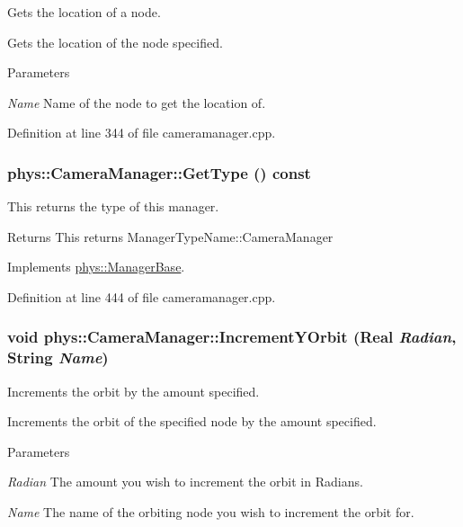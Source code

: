 Gets the location of a node. 

Gets the location of the node specified. 
\begin{DoxyParams}{Parameters}
\item[{\em Name}]Name of the node to get the location of. \end{DoxyParams}


Definition at line 344 of file cameramanager.cpp.

\hypertarget{classphys_1_1CameraManager_a8412ea634307aa280b615a3cc7c9b739}{
\subsubsection[{GetType}]{ phys::CameraManager::GetType () const}}
\label{d9/d91/classphys_1_1CameraManager_a8412ea634307aa280b615a3cc7c9b739}


This returns the type of this manager. 

\begin{DoxyReturn}{Returns}
This returns ManagerTypeName::CameraManager 
\end{DoxyReturn}


Implements \hyperlink{classphys_1_1ManagerBase_aff400b6599db635e24796d8221e9a0e3}{phys::ManagerBase}.



Definition at line 444 of file cameramanager.cpp.

\hypertarget{classphys_1_1CameraManager_a82001f0874a090717ced3fbe78ce795b}{
\subsubsection[{IncrementYOrbit}]{\setlength{\rightskip}{0pt plus 5cm}void phys::CameraManager::IncrementYOrbit ({\bf Real} {\em Radian}, \/  {\bf String} {\em Name})}}
\label{d9/d91/classphys_1_1CameraManager_a82001f0874a090717ced3fbe78ce795b}


Increments the orbit by the amount specified. 

Increments the orbit of the specified node by the amount specified. 
\begin{DoxyParams}{Parameters}
\item[{\em Radian}]The amount you wish to increment the orbit in Radians. \item[{\em Name}]The name of the orbiting node you wish to increment the orbit for. \end{DoxyParams}


